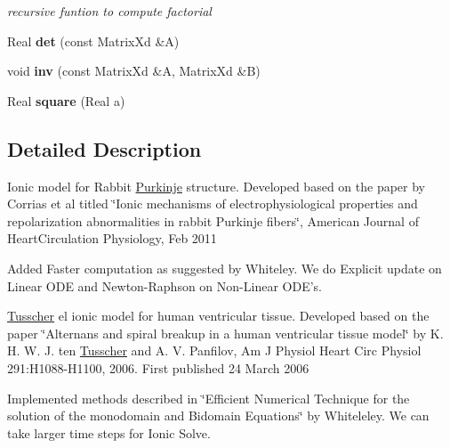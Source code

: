 \begin{DoxyCompactItemize}
\begin{DoxyCompactList}\small\item\em recursive funtion to compute factorial \item\end{DoxyCompactList}\item 
\hypertarget{namespacevoom_a402e7c86d4406c26e19717211a78f9af}{
Real {\bfseries det} (const MatrixXd \&A)}
\label{namespacevoom_a402e7c86d4406c26e19717211a78f9af}

\item 
\hypertarget{namespacevoom_a706ccce499faf4d752ef32a1607f1973}{
void {\bfseries inv} (const MatrixXd \&A, MatrixXd \&B)}
\label{namespacevoom_a706ccce499faf4d752ef32a1607f1973}

\item 
\hypertarget{namespacevoom_ad79c23f3d8d827d5b671afa1c5f8c028}{
Real {\bfseries square} (Real a)}
\label{namespacevoom_ad79c23f3d8d827d5b671afa1c5f8c028}

\end{DoxyCompactItemize}


\subsection{Detailed Description}
Ionic model for Rabbit \hyperlink{classvoom_1_1_purkinje}{Purkinje} structure. Developed based on the paper by Corrias et al titled \char`\"{}Ionic mechanisms of electrophysiological properties 
  and repolarization abnormalities in rabbit Purkinje fibers\char`\"{}, American Journal of HeartCirculation Physiology, Feb 2011
\begin{DoxyItemize}
\item Added Faster computation as suggested by Whiteley. We do Explicit update on Linear ODE and Newton-\/Raphson on Non-\/Linear ODE's. 
\end{DoxyItemize}\hyperlink{classvoom_1_1_tusscher}{Tusscher} el ionic model for human ventricular tissue. Developed based on the paper \char`\"{}Alternans and spiral breakup in a human ventricular tissue model\char`\"{} by K. H. W. J. ten \hyperlink{classvoom_1_1_tusscher}{Tusscher} and A. V. Panfilov, Am J Physiol Heart Circ Physiol 291:H1088-\/H1100, 2006. First published 24 March 2006
\begin{DoxyItemize}
\item Implemented methods described in \char`\"{}Efficient Numerical Technique for the 
  solution of the monodomain and Bidomain Equations\char`\"{} by Whiteleley. We can take larger time steps for Ionic Solve.
\end{DoxyItemize}

